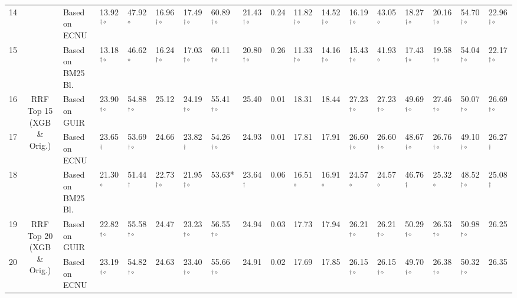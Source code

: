 \begin{table*}
{\begin{tabular}{ccllllllllllllllll}
14  &  & Based on ECNU  & 13.92$^{\dagger\diamond}$ & 47.92 $^{\diamond}$  & 16.96$^{\dagger\diamond}$ & 17.49$^{\dagger\diamond}$ & 60.89$^{\dagger\diamond}$ & 21.43$^{\dagger\diamond}$ & 0.24 & 11.82$^{\dagger\diamond}$ & 14.52$^{\dagger\diamond}$ & 16.19$^{\dagger\diamond}$ & 43.05$^{\diamond}$ & 18.27$^{\dagger\diamond}$ & 20.16$^{\dagger\diamond}$ & 54.70$^{\dagger\diamond}$ & 22.96$^{\dagger\diamond}$\tabularnewline
15  &  & Based on BM25 Bl.  & 13.18$^{\dagger\diamond}$ & 46.62 $^{\diamond}$  & 16.24$^{\dagger\diamond}$ & 17.03$^{\dagger\diamond}$ & 60.11$^{\dagger\diamond}$ & 20.80$^{\dagger\diamond}$ & 0.26 & 11.33$^{\dagger\diamond}$ & 14.16$^{\dagger\diamond}$ & 15.43$^{\dagger\diamond}$ & 41.93$^{\diamond}$  & 17.43$^{\dagger\diamond}$ & 19.58$^{\dagger\diamond}$ & 54.04$^{\dagger\diamond}$ & 22.17$^{\dagger\diamond}$\tabularnewline
\midrule 
16 & \multirow{3}{*}{RRF Top 15 (XGB \& Orig.)} & Based on GUIR  & 23.90$^{\dagger\diamond}$ & 54.88$^{\dagger\diamond}$ & 25.12  & 24.19$^{\dagger\diamond}$ & 55.41$^{\dagger\diamond}$ & 25.40 & 0.01 & 18.31  & 18.44 & 27.23$^{\dagger\diamond}$ & 27.23$^{\dagger\diamond}$ & 49.69$^{\dagger\diamond}$ & 27.46$^{\dagger\diamond}$ & 50.07$^{\dagger\diamond}$ & 26.69$^{\dagger\diamond}$\tabularnewline
17  &  & Based on ECNU  & 23.65$^{\dagger}$  & 53.69$^{\dagger\diamond}$ & 24.66  & 23.82$^{\dagger}$  & 54.26$^{\dagger\diamond}$ & 24.93 & 0.01 & 17.81  & 17.91 & 26.60$^{\dagger\diamond}$ & 26.60$^{\dagger\diamond}$ & 48.67$^{\dagger\diamond}$ & 26.76$^{\dagger\diamond}$ & 49.10$^{\dagger\diamond}$ & 26.27$^{\dagger}$ \tabularnewline
18  &  & Based on BM25 Bl.  & 21.30 $^{\diamond}$  & 51.44$^{\dagger}$  & 22.73$^{\dagger\diamond}$ & 21.95$^{\dagger\diamond}$ & 53.63{*} & 23.64$^{\dagger}$  & 0.06 & 16.51$^{\diamond}$  & 16.91$^{\diamond}$  & 24.57$^{\diamond}$  & 24.57$^{\diamond}$   & 46.76$^{\dagger}$  & 25.32$^{\diamond}$  & 48.52$^{\dagger\diamond}$ & 25.08$^{\dagger}$ \tabularnewline
\midrule 
19 & \multirow{3}{*}{RRF Top 20 (XGB \& Orig.)} & Based on GUIR  & 22.82$^{\dagger\diamond}$ & 55.58$^{\dagger\diamond}$ & 24.47  & 23.23$^{\dagger\diamond}$ & 56.55$^{\dagger\diamond}$ & 24.94 & 0.03 & 17.73  & 17.94 & 26.21$^{\dagger\diamond}$ & 26.21$^{\dagger\diamond}$ & 50.29$^{\dagger\diamond}$ & 26.53$^{\dagger\diamond}$ & 50.98$^{\dagger\diamond}$ & 26.25\tabularnewline
20  &  & Based on ECNU  & 23.19$^{\dagger\diamond}$ & 54.82$^{\dagger\diamond}$ & 24.63  & 23.40$^{\dagger\diamond}$ & 55.66$^{\dagger\diamond}$ & 24.91 & 0.02 & 17.69  & 17.85 & 26.15$^{\dagger\diamond}$ & 26.15$^{\dagger\diamond}$ & 49.70$^{\dagger\diamond}$ & 26.38$^{\dagger\diamond}$ & 50.32$^{\dagger\diamond}$ & 26.35\tabularnewline

\end{tabular}}
\end{table*}
